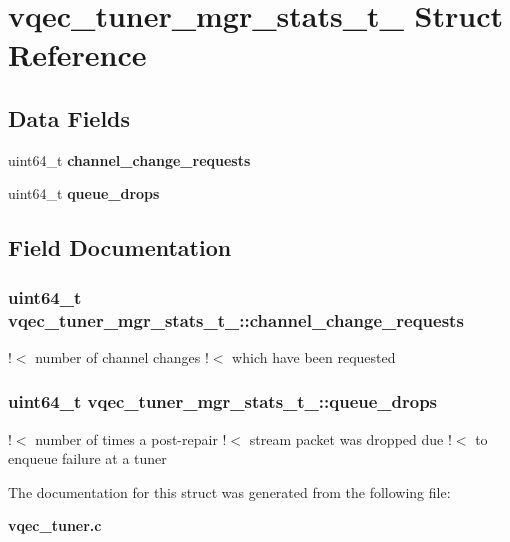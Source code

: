 \section{vqec\_\-tuner\_\-mgr\_\-stats\_\-t\_\- Struct Reference}
\label{structvqec__tuner__mgr__stats__t__}
\subsection*{Data Fields}
\begin{CompactItemize}
\item 
uint64\_\-t \bf{channel\_\-change\_\-requests}
\item 
uint64\_\-t \bf{queue\_\-drops}
\end{CompactItemize}


\subsection{Field Documentation}
\subsubsection{\setlength{\rightskip}{0pt plus 5cm}uint64\_\-t \bf{vqec\_\-tuner\_\-mgr\_\-stats\_\-t\_\-::channel\_\-change\_\-requests}}\label{structvqec__tuner__mgr__stats__t___f2fb989fde4bcac6b4ee0285a3018600}


!$<$ number of channel changes !$<$ which have been requested 
\subsubsection{\setlength{\rightskip}{0pt plus 5cm}uint64\_\-t \bf{vqec\_\-tuner\_\-mgr\_\-stats\_\-t\_\-::queue\_\-drops}}\label{structvqec__tuner__mgr__stats__t___6e5efb6281df148187a9485289bd656e}


!$<$ number of times a post-repair !$<$ stream packet was dropped due !$<$ to enqueue failure at a tuner 

The documentation for this struct was generated from the following file:\begin{CompactItemize}
\item 
\bf{vqec\_\-tuner.c}\end{CompactItemize}
